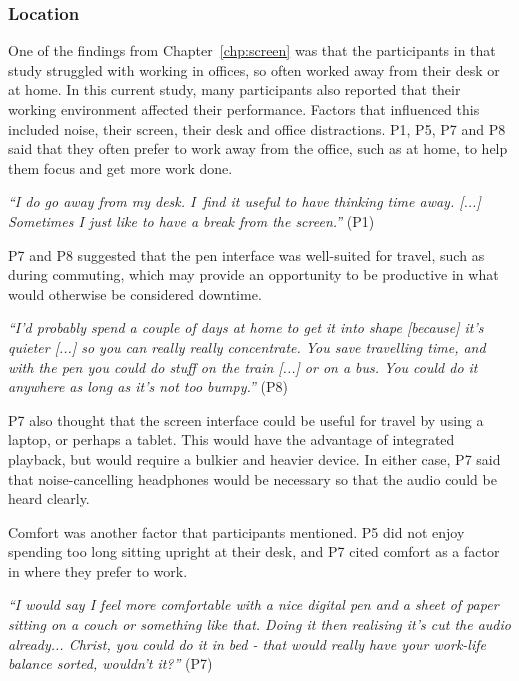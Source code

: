 \subsubsection{Location}

One of the findings from Chapter~\ref{chp:screen} was that the participants in that study struggled with working in
offices, so often worked away from their desk or at home. In this current study, many participants also reported that
their working environment affected their performance. Factors that influenced this included noise, their screen, their
desk and office distractions. P1, P5, P7 and P8 said that they often prefer to work away from the office, such as at
home, to help them focus and get more work done.

\textit{``I do go away from my desk. I find it useful to have thinking time away. [...] Sometimes I just like to have a
break from the screen.''} (P1)

P7 and P8 suggested that the pen interface was well-suited for travel, such as during commuting, which may provide an
opportunity to be productive in what would otherwise be considered downtime.

\textit{``I'd probably spend a couple of days at home to get it into shape [because] it's quieter [...]
  so you can really really concentrate. You save travelling time, and with the pen you could do stuff on the train [...]
or on a bus. You could do it anywhere as long as it's not too bumpy.''} (P8)

P7 also thought that the screen interface could be useful for travel by using a laptop, or perhaps a tablet. This would
have the advantage of integrated playback, but would require a bulkier and heavier device. In either case, P7 said that
noise-cancelling headphones would be necessary so that the audio could be heard clearly.

Comfort was another factor that participants mentioned. P5 did not enjoy spending too long sitting upright at their
desk, and P7 cited comfort as a factor in where they prefer to work.

\textit{``I would say I feel more comfortable with a nice digital pen and a sheet of paper sitting on a couch or
  something like that. Doing it then realising it's cut the audio already... Christ, you could do it in bed - that would
really have your work-life balance sorted, wouldn't it?''} (P7)

